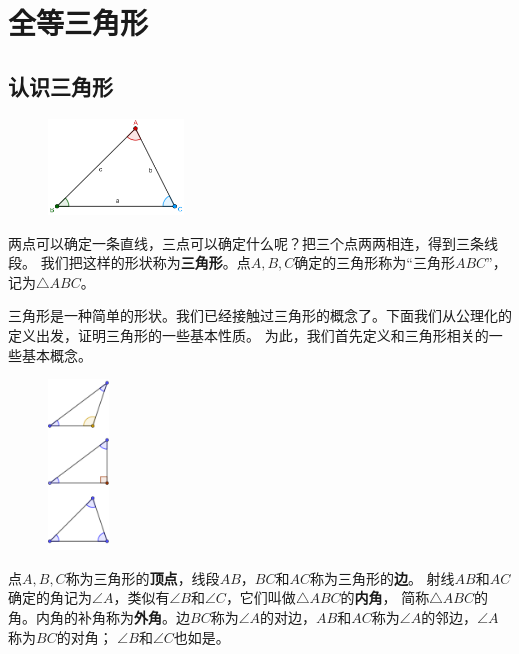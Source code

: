 \documentclass[12pt,UTF8]{ctexbook}
\begin{document}
\chapter{全等三角形}
\section{认识三角形}
\begin{figure} %
    \vspace{-35pt}
    \includegraphics[width=0.32\textwidth]{三角形0.png}
\end{figure}
两点可以确定一条直线，三点可以确定什么呢？把三个点两两相连，得到三条线段。
我们把这样的形状称为\textbf{三角形}。点$A,B,C$确定的三角形称为“三角形$ABC$”，记为$\triangle ABC$。

三角形是一种简单的形状。我们已经接触过三角形的概念了。下面我们从公理化的定义出发，证明三角形的一些基本性质。
为此，我们首先定义和三角形相关的一些基本概念。 

\begin{figure} %
    \vspace{-10pt}
    \includegraphics[width=0.144\textwidth]{三角形1.png}
\end{figure}

点$A,B,C$称为三角形的\textbf{顶点}，线段$AB$，$BC$和$AC$称为三角形的\textbf{边}。
射线$AB$和$AC$确定的角记为$\angle A$，类似有$\angle B$和$\angle C$，它们叫做$\triangle ABC$的\textbf{内角}，
简称$\triangle ABC$的角。内角的补角称为\textbf{外角}。边$BC$称为$\angle A$的对边，$AB$和$AC$称为$\angle A$的邻边，$\angle A$称为$BC$的对角；
$\angle B$和$\angle C$也如是。
\end{document}

